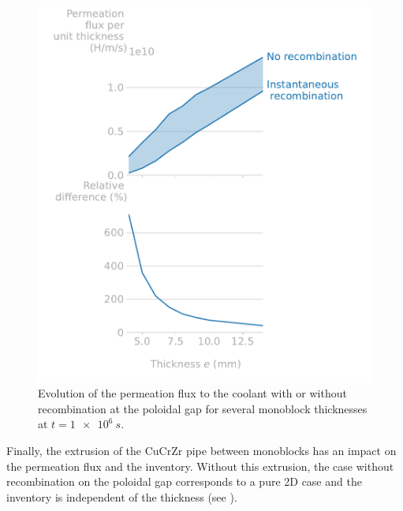 \begin{figure} [h]
    \centering
    \includegraphics[width=\linewidth]{Figures/Chapter3/monoblocks/3D_monoblocks/permeation_flux_vs_thickness.pdf}
    \caption{Evolution of the permeation flux to the coolant with or without recombination at the poloidal gap for several monoblock thicknesses at $t=\SI{1e6}{s}$.}
\end{figure}

Finally, the extrusion of the CuCrZr pipe between monoblocks has an impact on the permeation flux and the inventory.
Without this extrusion, the case without recombination on the poloidal gap corresponds to a pure 2D case and the inventory is independent of the thickness (see ).


